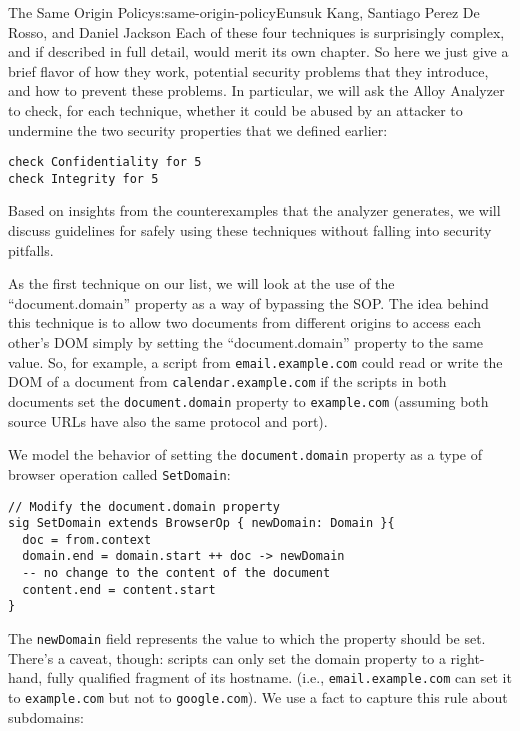 \begin{aosachapter}{The Same Origin Policy}{s:same-origin-policy}{Eunsuk Kang, Santiago Perez De Rosso, and Daniel Jackson}
Each of these four techniques is surprisingly complex, and if described
in full detail, would merit its own chapter. So here we just give a
brief flavor of how they work, potential security problems that they
introduce, and how to prevent these problems. In particular, we will ask
the Alloy Analyzer to check, for each technique, whether it could be
abused by an attacker to undermine the two security properties that we
defined earlier:

\begin{verbatim}
check Confidentiality for 5
check Integrity for 5
\end{verbatim}

Based on insights from the counterexamples that the analyzer generates,
we will discuss guidelines for safely using these techniques without
falling into security pitfalls.

\label{domain-property}

As the first technique on our list, we will look at the use of the
``document.domain'' property as a way of bypassing the SOP. The idea
behind this technique is to allow two documents from different origins
to access each other's DOM simply by setting the ``document.domain''
property to the same value. So, for example, a script from
\texttt{email.example.com} could read or write the DOM of a document
from \texttt{calendar.example.com} if the scripts in both documents set
the \texttt{document.domain} property to \texttt{example.com} (assuming
both source URLs have also the same protocol and port).

We model the behavior of setting the \texttt{document.domain} property
as a type of browser operation called \texttt{SetDomain}:

\begin{verbatim}
// Modify the document.domain property
sig SetDomain extends BrowserOp { newDomain: Domain }{
  doc = from.context
  domain.end = domain.start ++ doc -> newDomain
  -- no change to the content of the document
  content.end = content.start
}
\end{verbatim}

The \texttt{newDomain} field represents the value to which the property
should be set. There's a caveat, though: scripts can only set the domain
property to a right-hand, fully qualified fragment of its hostname.
(i.e., \texttt{email.example.com} can set it to \texttt{example.com} but
not to \texttt{google.com}). We use a fact to capture this rule about
subdomains:


\end{aosachapter}
